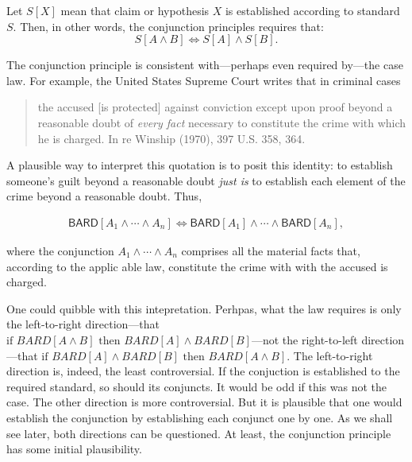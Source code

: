 \documentclass[10pt,dvipsnames,enabledeprecatedfontcommands]{scrartcl}
\newcommand{\et}{\wedge}
\begin{document}
\noindent
Let \(S[X]\) mean that claim or hypothesis \(X\) is established
according to standard \(S\). Then, in other words, the conjunction
principles requires that:
\[S[A \wedge B] \Leftrightarrow S[A] \wedge S[B].\]

The conjunction principle is consistent with---perhaps even required
by---the case law. For example, the United States Supreme Court writes
that in criminal cases

\begin{quote}
the accused [is protected] against conviction except upon proof beyond a reasonable doubt of \textit{every fact} necessary to constitute the crime with which he is charged. In re Winship (1970), 397 U.S. 358, 364. 
\end{quote}

\noindent
A plausible way to interpret this quotation is to posit this identity:
to establish someone's guilt beyond a reasonable doubt \textit{just is}
to establish each element of the crime beyond a reasonable doubt. Thus,

\begin{align*}\mathsf{BARD}[A_1 \wedge \cdots \wedge A_n] \Leftrightarrow \mathsf{BARD}[A_1] \wedge \cdots \wedge \mathsf{BARD}[A_n],
\end{align*}

\noindent
where the conjunction \(A_1 \et \cdots \et A_n\) comprises all the
material facts that, according to the applic able law, constitute the
crime with with the accused is
charged.

One could quibble with this intepretation. Perhpas, what the law
requires is only the left-to-right direction---that
\(\text{if }BARD[A \wedge B] \text{ then } BARD[A] \wedge BARD[B]\)---not
the right-to-left direction---that
\(\text{if } BARD[A] \wedge BARD[B] \text{ then }BARD[A \wedge B]\). The
left-to-right direction is, indeed, the least
controversial.
If the conjuction is established to the required standard, so should its
conjuncts.
It would be odd if this was not the case. The other direction is more
controversial. But it is plausible that one would establish
the conjunction by establishing each conjunct one by one. As we shall
see later, both directions can be questioned. At least, the conjunction
principle has some initial plausibility.
\end{document}

